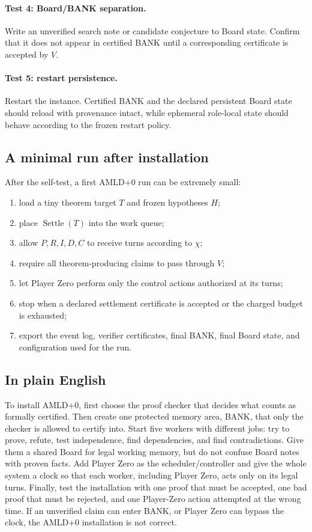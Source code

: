 \documentclass[11pt]{article}
\theoremstyle{definition}
\begin{document}
\paragraph{Test 4: Board/BANK separation.}
Write an unverified search note or candidate conjecture to Board state. Confirm that it does not appear in certified BANK until a corresponding certificate is accepted by $V$.

\paragraph{Test 5: restart persistence.}
Restart the instance. Certified BANK and the declared persistent Board state should reload with provenance intact, while ephemeral role-local state should behave according to the frozen restart policy.

\subsection{A minimal run after installation}

After the self-test, a first AMLD+0 run can be extremely small:
\begin{enumerate}[label=(\arabic*),leftmargin=*]
\item load a tiny theorem target $T$ and frozen hypotheses $H$;
\item place $\operatorname{Settle}(T)$ into the work queue;
\item allow $P,R,I,D,C$ to receive turns according to $\chi$;
\item require all theorem-producing claims to pass through $V$;
\item let Player Zero perform only the control actions authorized at its turns;
\item stop when a declared settlement certificate is accepted or the charged budget is exhausted;
\item export the event log, verifier certificates, final BANK, final Board state, and configuration used for the run.
\end{enumerate}

\subsection{In plain English}

To install AMLD+0, first choose the proof checker that decides what counts as formally certified. Then create one protected memory area, BANK, that only the checker is allowed to certify into. Start five workers with different jobs: try to prove, refute, test independence, find dependencies, and find contradictions. Give them a shared Board for legal working memory, but do not confuse Board notes with proven facts. Add Player Zero as the scheduler/controller and give the whole system a clock so that each worker, including Player Zero, acts only on its legal turns. Finally, test the installation with one proof that must be accepted, one bad proof that must be rejected, and one Player-Zero action attempted at the wrong time. If an unverified claim can enter BANK, or Player Zero can bypass the clock, the AMLD+0 installation is not correct.
\end{document}
